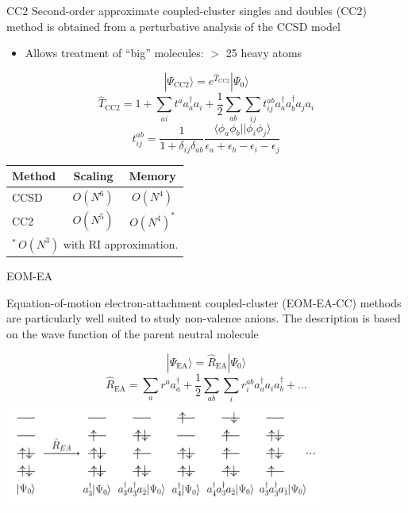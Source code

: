 \documentclass[9pt,t,xcolor=table]{beamer}
\begin{document}
\begin{frame}{\huge CC2}\large
	Second-order approximate coupled-cluster singles and doubles (CC2) method is obtained from a perturbative analysis of the CCSD model
	\vspace{4pt}
	\begin{itemize}
		\item Allows treatment of “big” molecules: $>$ 25 heavy atoms
	\end{itemize}
	\vspace{4pt}
	\centering
	\[ |\Psi_{\mathrm{CC2}} \rangle = e^{\hat{T}_{\mathrm{CC2}}} | \Psi_0 \rangle \]
	\vspace{3pt}
	\[
	\hat{T}_{\mathrm{CC2}} = 1 + \sum_{ai} t^a a_a^\dagger a_i + \frac{1}{2} \sum_{ab} \sum_{ij} t_{ij}^{ab} a_a^\dagger a_b^\dagger a_j a_i  \] 
	\vspace{3pt}
	\[ t^{ab}_{ij} = \frac{1}{1+\delta_{ij}\delta_{ab}}\frac{\langle \phi_a \phi_b || \phi_i \phi_j \rangle}{\epsilon_a + \epsilon_b - \epsilon_i - \epsilon_j}
	\]
	\vspace{3pt}
	\begin{table}
		\centering
		\begin{tabular}{lcc}\toprule
		\textbf{Method} & \textbf{Scaling} & \textbf{Memory}\\\midrule
		CCSD & $O(N^6)$ & $O(N^{4})$\\
		CC2 & $O(N^5)$ & $O(N^{4})^*$\\\bottomrule
		\multicolumn{3}{l}{\small $^*\,O(N^3)$ with RI approximation.}
		\end{tabular}
	\end{table}
\end{frame}

\begin{frame}{\huge EOM-EA}\large
	\begin{flushleft}
    Equation-of-motion electron-attachment coupled-cluster (EOM-EA-CC) methods are particularly well suited to study non-valence anions.
	The description is based on the wave function of the parent neutral molecule
	\end{flushleft}
	\centering
	\vspace{4pt}
	    \[ |\Psi_{\mathrm{EA}} \rangle = \hat{R}_{\mathrm{EA}} | \Psi_0 \rangle \]
	\vspace{3pt}
		\[ \hat{R}_{\mathrm{EA}} = \sum_{a} r^a a_a^\dagger + \frac{1}{2} \sum_{ab} \sum_{i} r_{i}^{ab} a_a^\dagger a_i a_b^\dagger + \dots \]
	\vspace{3pt}
	\includegraphics[width=0.8\textwidth]{Figs/EOM_EA.pdf}
	\vspace{3pt}
\end{frame}
\end{document}
